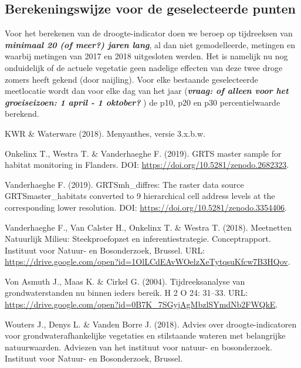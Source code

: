\documentclass[11pt,]{book}
\begin{document}
\subsection{Berekeningswijze voor de geselecteerde
punten}\label{berekeningswijze-voor-de-geselecteerde-punten}

Voor het berekenen van de droogte-indicator doen we beroep op
tijdreeksen van \textbf{\emph{minimaal 20 (of meer?) jaren lang}}, al
dan niet gemodelleerde, metingen en waarbij metingen van 2017 en 2018
uitgesloten werden. Het is namelijk nu nog onduidelijk of de actuele
vegetatie geen nadelige effecten van deze twee droge zomers heeft gekend
(door naijling). Voor elke bestaande geselecteerde meetlocatie wordt dan
voor elke dag van het jaar (\textbf{\emph{vraag: of alleen voor het
groeiseizoen: 1 april - 1 oktober? }}) de p10, p20 en p30
percentielwaarde berekend.

\hypertarget{refs}{}
\hypertarget{ref-RN5899}{}
KWR \& Waterware (2018). Menyanthes, versie 3.x.b.w.

\hypertarget{ref-onkelinx_grts_2019}{}
Onkelinx T., Westra T. \& Vanderhaeghe F. (2019). GRTS master sample for
habitat monitoring in Flanders. DOI:
\url{https://doi.org/10.5281/zenodo.2682323}.

\hypertarget{ref-vanderhaeghe_grtsmh_diffres_2019}{}
Vanderhaeghe F. (2019). GRTSmh\_diffres: The raster data source
GRTSmaster\_habitats converted to 9 hierarchical cell address levels at
the corresponding lower resolution. DOI:
\url{https://doi.org/10.5281/zenodo.3354406}.

\hypertarget{ref-vanderhaeghe_meetnetten_2018}{}
Vanderhaeghe F., Van Calster H., Onkelinx T. \& Westra T. (2018).
Meetnetten Natuurlijk Milieu: Steekproefopzet en inferentiestrategie.
Conceptrapport. Instituut voor Natuur- en Bosonderzoek, Brussel. URL:
\url{https://drive.google.com/open?id=1OlLCdEAvWOelzXeTytqsuKfcw7B3HQov}.

\hypertarget{ref-RN877}{}
Von Asmuth J., Maas K. \& Cirkel G. (2004). Tijdreeksanalyse van
grondwaterstanden nu binnen ieders bereik. H 2 O 24: 31--33. URL:
\url{https://drive.google.com/open?id=0B7K_7SGyjAgMbzlSYmdNb2FWQkE}.

\hypertarget{ref-RN5703}{}
Wouters J., Denys L. \& Vanden Borre J. (2018). Advies over
droogte-indicatoren voor grondwaterafhankelijke vegetaties en
stilstaande wateren met belangrijke natuurwaarden. Adviezen van het
instituut voor natuur- en bosonderzoek. Instituut voor Natuur- en
Bosonderzoek, Brussel.
\end{document}
